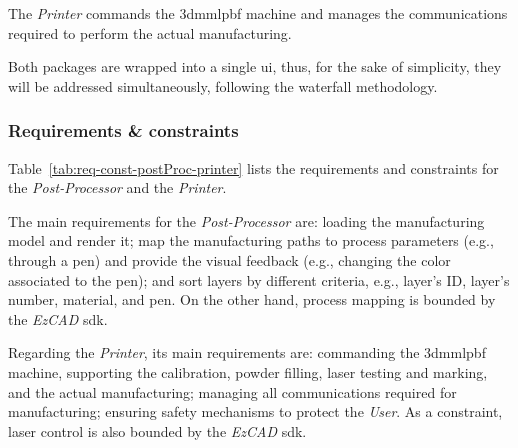 The \emph{Printer} commands the \gls{3dmmlpbf} machine and manages the
communications required to perform the actual manufacturing.

Both packages are wrapped into a single \gls{ui}, thus, for the sake of
simplicity, they will be addressed simultaneously, following the waterfall
methodology.

\subsubsection{Requirements \& constraints}%
\label{sec:requ--constr-manuf}
Table~\ref{tab:req-const-postProc-printer} lists the requirements and
constraints for the \emph{Post-Processor} and the \emph{Printer}.

The main
requirements for the \emph{Post-Processor} are: loading the manufacturing model
and render it; map the manufacturing paths to process parameters (e.g., through
a pen) and provide the visual feedback (e.g., changing the color associated to
the pen); and sort layers by
different criteria, e.g., layer's ID, layer's number, material, and pen. On the other hand,
process mapping is bounded by the \emph{EzCAD} \gls{sdk}.

Regarding the \emph{Printer}, its main requirements are: commanding the
\gls{3dmmlpbf} machine, supporting the calibration, powder filling, laser
testing and marking, and the actual manufacturing; managing all communications
required for manufacturing; ensuring safety mechanisms to protect the
\emph{User}. As a constraint, laser control is also bounded by the \emph{EzCAD} \gls{sdk}.

